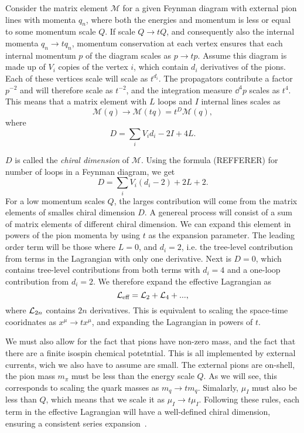 Consider the matrix element $\mathcal M$ for a given Feynman diagram with external pion lines with momenta $q_n$, where both the energies and momentum is less or equal to some momentum scale $Q$.
If scale $Q\rightarrow tQ$, and consequently also the internal momenta $q_n \rightarrow tq_n$, momentum conservation at each vertex ensures that each internal momentum $p$ of the diagram scales as $p \rightarrow tp$.
Assume this diagram is made up of $V_i$ copies of the vertex $i$, which contain $d_i$ derivatives of the pions.
Each of these vertices scale will scale as $t^{d_i}$.
The propagators contribute a factor $p^{-2}$ and will therefore scale as $t^{-2}$, and the integration measure $\dd^4 p$ scales as $t^4$.
This means that a matrix element with $L$ loops and $I$ internal lines scales as
\begin{equation}
    \mathcal M(q) \rightarrow \mathcal M(t q) = t^D \mathcal M(q),
\end{equation}
where 
\begin{equation}
    D = \sum_i V_i d_i - 2 I + 4 L.
\end{equation}


$D$ is called the \emph{chiral dimension} of $\mathcal M$.
Using the formula (REFFERER) for number of loops in a Feynman diagram, we get
\begin{equation}
    D = \sum_i V_i(d_i - 2) + 2 L + 2.
\end{equation}
For a low momentum scales $Q$, the larges contribution will come from the matrix elements of smalles chiral dimension $D$.
A genereal process will consist of a sum of matrix elements of different chiral dimension.
We can expand this element in powers of the pion momenta by using $t$ as the expansion parameter.
The leading order term will be those where $L = 0$, and $d_i = 2$, i.e. the tree-level contribution from terms in the Lagrangian with only one derivative.
Next is $D = 0$, which contains tree-level contributions from both terms with $d_i = 4$ and a one-loop contribution from $d_i = 2$.
We therefore expand the effective Lagrangian as 
\begin{equation}
    \mathcal{L}_\text{eff} = \mathcal{L}_2 + \mathcal{L}_4 + ...,
\end{equation}
where $\mathcal{L}_{2n}$ contains $2n$ derivatives.
This is equivalent to scaling the space-time cooridnates as $x^\mu \rightarrow tx^\mu$, and expanding the Lagrangian in powers of $t$.

We must also allow for the fact that pions have non-zero mass, and the fact that there are a finite isospin chemical potetntial.
This is all implemented by external currents, wich we also have to assume are small.
The external pions are on-shell, the pion mass $m_\pi$ must be less than the energy scale $Q$.
As we will see, this corresponds to scaling the quark masses as $m_q \rightarrow t m_q$.
Simalarly, $\mu_I$ must also be less than $Q$, which means that we scale it as $\mu_I\rightarrow t \mu_I$.
Following these rules, each term in the effective Lagrangian will have a well-defined chiral dimension, ensuring a consistent series expansion~\cite{weinberg_1996_vol2,WeinbergPhenom,Scherer2002IntroductionTC}.

